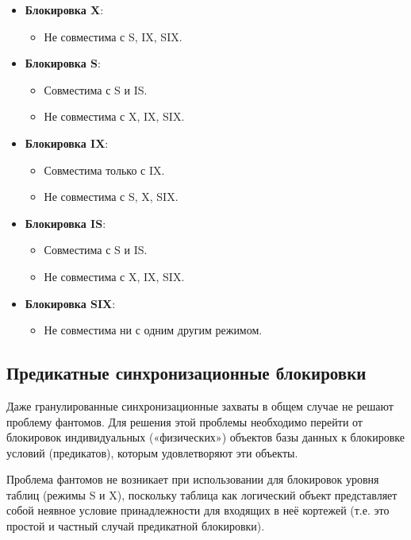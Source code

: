 \documentclass[a4paper,12pt]{article}
\begin{document}
\begin{itemize}
    \item \textbf{Блокировка X}:
    \begin{itemize}
        \item Не совместима с S, IX, SIX.
    \end{itemize}
    
    \item \textbf{Блокировка S}:
    \begin{itemize}
        \item Совместима с S и IS.
        \item Не совместима с X, IX, SIX.
    \end{itemize}
    
    \item \textbf{Блокировка IX}:
    \begin{itemize}
        \item Совместима только с IX.
        \item Не совместима с S, X, SIX.
    \end{itemize}
    
    \item \textbf{Блокировка IS}:
    \begin{itemize}
        \item Совместима с S и IS.
        \item Не совместима с X, IX, SIX.
    \end{itemize}
    
    \item \textbf{Блокировка SIX}:
    \begin{itemize}
        \item Не совместима ни с одним другим режимом.
    \end{itemize}
\end{itemize}

\subsection{Предикатные синхронизационные блокировки}

Даже гранулированные синхронизационные захваты в общем случае не решают проблему фантомов. Для решения этой проблемы необходимо перейти от блокировок индивидуальных («физических») объектов базы данных к блокировке условий (предикатов), которым удовлетворяют эти объекты.

Проблема фантомов не возникает при использовании для блокировок уровня таблиц (режимы S и X), поскольку таблица как логический объект представляет собой неявное условие принадлежности для входящих в неё кортежей (т.е. это простой и частный случай предикатной блокировки).
\end{document}

